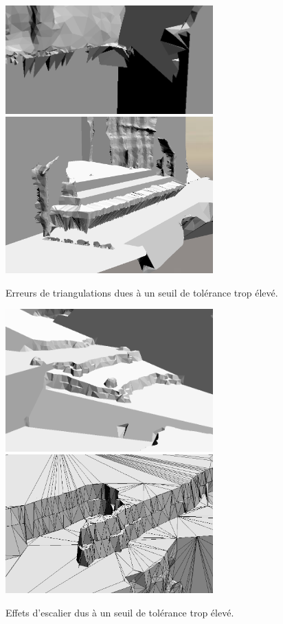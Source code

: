 ﻿\documentclass[12pt, twoside]{article}
\begin{document}
\begin{figure}[h]
\centering
\includegraphics[width=8cm,keepaspectratio]{hightol1.png} \includegraphics[width=8cm,keepaspectratio]{hightol2.png} 
\caption{Erreurs de triangulations dues à un seuil de tolérance trop élevé.}
\label{fig:hightol}
\end{figure}

\begin{figure}[h]
\centering
\includegraphics[width=8cm,keepaspectratio]{escalier1.png} \includegraphics[width=8cm,keepaspectratio]{escalier2.png} 
\caption{Effets d'escalier dus à un seuil de tolérance trop élevé.}
\label{fig:escalier}
\end{figure}
\end{document}
